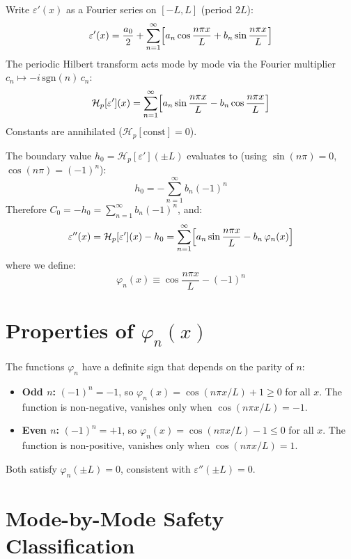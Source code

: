 \documentclass[11pt]{article}
\newcommand{\eps}{\varepsilon}
\newcommand{\Hp}{\mathcal{H}_p}
\begin{document}
Write $\eps'(x)$ as a Fourier series on $[-L, L]$ (period $2L$):
\begin{equation}
\eps'(x) = \frac{a_0}{2} + \sum_{n=1}^{\infty}\Bigl[a_n \cos\frac{n\pi x}{L} + b_n \sin\frac{n\pi x}{L}\Bigr]
\end{equation}
The periodic Hilbert transform acts mode by mode via the Fourier multiplier $c_n \mapsto -i\,\text{sgn}(n)\,c_n$:
\begin{equation}
\Hp[\eps'](x) = \sum_{n=1}^{\infty}\Bigl[a_n \sin\frac{n\pi x}{L} - b_n \cos\frac{n\pi x}{L}\Bigr]
\end{equation}
Constants are annihilated ($\Hp[\text{const}] = 0$).

The boundary value $h_0 = \Hp[\eps'](\pm L)$ evaluates to (using $\sin(n\pi) = 0$, $\cos(n\pi) = (-1)^n$):
\begin{equation}
h_0 = -\sum_{n=1}^{\infty} b_n (-1)^n
\end{equation}
Therefore $C_0 = -h_0 = \sum_{n=1}^{\infty} b_n(-1)^n$, and:
\begin{equation}\label{eq:eps-imag-fourier}
\eps''(x) = \Hp[\eps'](x) - h_0 = \sum_{n=1}^{\infty}\Bigl[a_n \sin\frac{n\pi x}{L} - b_n\,\varphi_n(x)\Bigr]
\end{equation}
where we define:
\begin{equation}\label{eq:phi-n}
\boxed{\varphi_n(x) \equiv \cos\frac{n\pi x}{L} - (-1)^n}
\end{equation}

\section{Properties of $\varphi_n(x)$}

The functions $\varphi_n$ have a definite sign that depends on the parity of $n$:

\begin{itemize}
\item \textbf{Odd $n$:} $(-1)^n = -1$, so $\varphi_n(x) = \cos(n\pi x/L) + 1 \geq 0$ for all $x$.  The function is non-negative, vanishes only when $\cos(n\pi x/L) = -1$.
\item \textbf{Even $n$:} $(-1)^n = +1$, so $\varphi_n(x) = \cos(n\pi x/L) - 1 \leq 0$ for all $x$.  The function is non-positive, vanishes only when $\cos(n\pi x/L) = 1$.
\end{itemize}

Both satisfy $\varphi_n(\pm L) = 0$, consistent with $\eps''(\pm L) = 0$.

\section{Mode-by-Mode Safety Classification}
\end{document}
